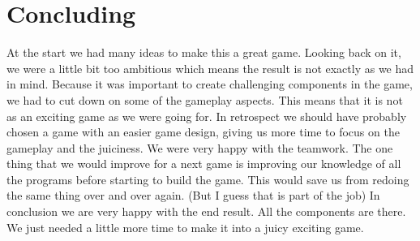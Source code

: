 \documentclass{article}
\begin{document}
\newpage
\section{Concluding}
At the start we had many ideas to make this a great game. Looking back on it, we were a little bit too ambitious which means the result is not exactly as we had in mind. Because it was important to create challenging components in the game, we had to cut down on some of the gameplay aspects. This means that it is not as an exciting game as we were going for. In retrospect we should have probably chosen a game with an easier game design, giving us more time to focus on the gameplay and the juiciness. We were very happy with the teamwork. The one thing that we would improve for a next game is improving our knowledge of all the programs before starting to build the game. This would save us from redoing the same thing over and over again. (But I guess that is part of the job)
In conclusion we are very happy with the end result. All the components are there. We just needed a little more time to make it into a juicy exciting game.
\end{document}
